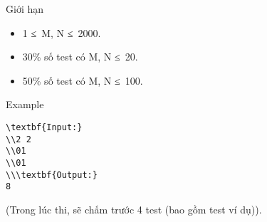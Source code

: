 Giới hạn
\begin{itemize}
	\item     1 ≤ M, N ≤ 2000.   
	\item     30\% số test có M, N ≤ 20.   
	\item     50\% số test có M, N ≤ 100.   
\end{itemize}
\begin{itemize}
\end{itemize}
Example
\begin{verbatim}
\textbf{Input:}
\\2 2
\\01
\\01
\\\textbf{Output:}
8\end{verbatim}

(Trong lúc thi, sẽ chấm trước 4 test (bao gồm test ví dụ)).